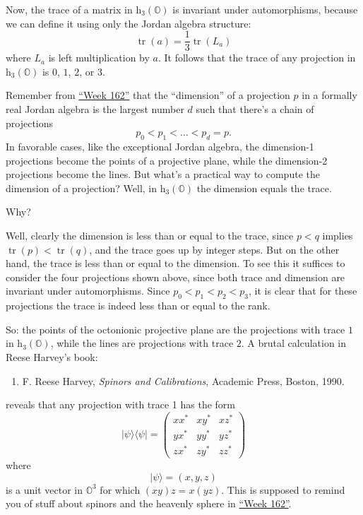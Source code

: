 \documentclass{article}
\def\tightlist{}
\begin{document}
Now, the trace of a matrix in \(\mathrm{h}_3(\mathbb{O})\) is invariant
under automorphisms, because we can define it using only the Jordan
algebra structure:
\[\operatorname{tr}(a) = \frac13 \operatorname{tr}(L_a)\] where \(L_a\)
is left multiplication by \(a\). It follows that the trace of any
projection in \(\mathrm{h}_3(\mathbb{O})\) is \(0\), \(1\), \(2\), or
\(3\).

Remember from \protect\hyperlink{week162}{``Week 162''} that the
``dimension'' of a projection \(p\) in a formally real Jordan algebra is
the largest number \(d\) such that there's a chain of projections
\[p_0<p_1<\ldots<p_d=p.\] In favorable cases, like the exceptional
Jordan algebra, the dimension-1 projections become the points of a
projective plane, while the dimension-2 projections become the lines.
But what's a practical way to compute the dimension of a projection?
Well, in \(\mathrm{h}_3(\mathbb{O})\) the dimension equals the trace.

Why?

Well, clearly the dimension is less than or equal to the trace, since
\(p < q\) implies \(\operatorname{tr}(p) < \operatorname{tr}(q)\), and
the trace goes up by integer steps. But on the other hand, the trace is
less than or equal to the dimension. To see this it suffices to consider
the four projections shown above, since both trace and dimension are
invariant under automorphisms. Since \(p_0< p_1 < p_2 < p_3\), it is
clear that for these projections the trace is indeed less than or equal
to the rank.

So: the points of the octonionic projective plane are the projections
with trace \(1\) in \(\mathrm{h}_3(\mathbb{O})\), while the lines are
projections with trace \(2\). A brutal calculation in Reese Harvey's
book:

\begin{enumerate}
\def\labelenumi{\arabic{enumi})}
\setcounter{enumi}{6}
\tightlist
\item
  F. Reese Harvey, \emph{Spinors and Calibrations}, Academic Press,
  Boston, 1990.
\end{enumerate}

reveals that any projection with trace 1 has the form \[
  \vert\psi\rangle\langle\psi\vert =
  \left(
    \begin{array}{ccc}
      xx^*&xy^*&xz^*
    \\yx^*&yy^*&yz^*
    \\zx^*&zy^*&zz^*
    \end{array}
  \right)
\] where \[\vert\psi\rangle = (x,y,z)\] is a unit vector in
\(\mathbb{O}^3\) for which \((xy)z = x(yz)\). This is supposed to remind
you of stuff about spinors and the heavenly sphere in
\protect\hyperlink{week162}{``Week 162''}.
\end{document}
